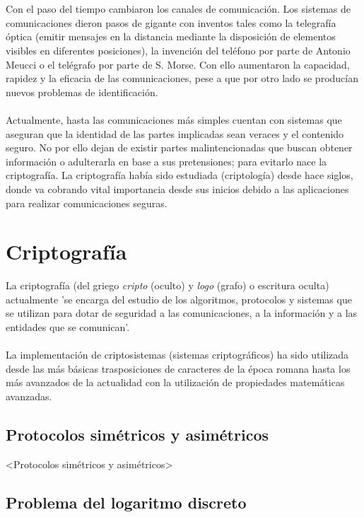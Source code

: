 \documentclass[../PFC.tex]{subfiles}
\begin{document}
\\\\
Con el paso del tiempo cambiaron los canales de comunicación. Los sistemas de comunicaciones dieron pasos de gigante con inventos tales como la telegrafía óptica (emitir mensajes en la distancia mediante la disposición de elementos visibles en diferentes posiciones), la invención del teléfono por parte de Antonio Meucci o el telégrafo por parte de S. Morse. Con ello aumentaron la capacidad, rapidez y la eficacia de las comunicaciones, pese a que por otro lado se producían nuevos problemas de identificación.
\\\\
Actualmente, hasta las comunicaciones más simples cuentan con sistemas que aseguran que la identidad de las partes implicadas sean veraces y el contenido seguro. No por ello dejan de existir partes malintencionadas que buscan obtener información o adulterarla en base a sus pretensiones; para evitarlo nace la criptografía. La criptografía había sido estudiada (criptología) desde hace siglos, donde va cobrando vital importancia desde sus inicios debido a las aplicaciones para realizar comunicaciones seguras.

\section{Criptografía}
\label{Criptografía}

La criptografía (del griego \textit{cripto} (oculto) y \textit{logo} (grafo) o escritura oculta) actualmente 'se encarga del estudio de los algoritmos, protocolos y sistemas que se utilizan para dotar de seguridad a las comunicaciones, a la información y a las entidades que se comunican'\cite{pastor1998criptografia}.
\\\\
La implementación de criptosistemas (sistemas criptográficos) ha sido utilizada desde las más básicas trasposiciones de caracteres de la época romana hasta los más avanzados de la actualidad con la utilización de propiedades matemáticas avanzadas.

\subsection{Protocolos simétricos y asimétricos}
\label{Protocolos simétricos y asimétricos}

<Protocolos simétricos y asimétricos>

\subsection{Problema del logaritmo discreto}
\label{Problema del logaritmo discreto}
\end{document}
